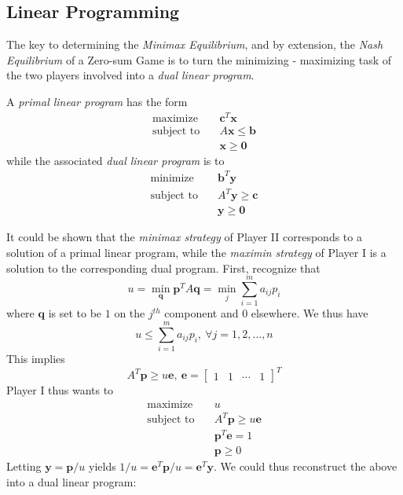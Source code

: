 \documentclass[11pt,reqno, a4]{amsart}
\begin{document}
\subsection{Linear Programming}
The key to determining the \textit{Minimax Equilibrium}, and by extension, the \textit{Nash Equilibrium} of a Zero-sum Game is to turn the minimizing - maximizing task of the two players involved into a \textit{dual linear program}. 
\begin{definition}
    A \textit{primal linear program} has the form
    \begin{align*}
        \text{maximize}& \quad \bm{c}^T\bm{x} \\
        \text{subject to}& \quad A\bm{x} \leq \bm{b}\\
        & \quad \bm{x \geq 0}
    \end{align*}
    while the associated \textit{dual linear program} is to 
    \begin{align*}
        \text{minimize}& \quad \bm{b}^T\bm{y} \\
        \text{subject to}& \quad A^T\bm{y} \geq \bm{c}\\
        & \quad \bm{y \geq 0}
    \end{align*}
\end{definition}
It could be shown that the \textit{minimax strategy} of Player II corresponds to a solution of a primal linear program, while the \textit{maximin strategy} of Player I is a solution to the corresponding dual program. First, recognize that \[
u= \min_{\bm{q}} \bm{p}^TA\bm{q} = \min_j \sum_{i = 1}^m a_{ij}p_i
\]
where $\bm{q}$ is set to be $1$ on the $j^{th}$ component and 0 elsewhere. We thus have 
\[
u \leq \sum_{i = 1}^m a_{ij} p_i, \ \forall j = 1, 2, \dots, n
\]
This implies 
\[
A^T\bm{p} \geq u \bm{e}, \ \bm{e} = \begin{bmatrix}
    1 & 1 & \cdots & 1
\end{bmatrix}^T
\]
Player I thus wants to 
    \begin{align*}
        \text{maximize}& \quad u\\
        \text{subject to}& \quad A^T\bm{p} \geq u \bm{e}\\
        & \quad \bm{p}^T\bm{e} = 1\\
        & \quad \bm{p} \geq 0
    \end{align*}
        Letting $\bm{y} = \bm{p}/{u}$ yields 
        \(
        {1/u} = \bm{e}^T\bm{p}/u = \bm{e}^T\bm{y}.
        \)
        We could thus reconstruct the above into a dual linear program:  
\end{document}
